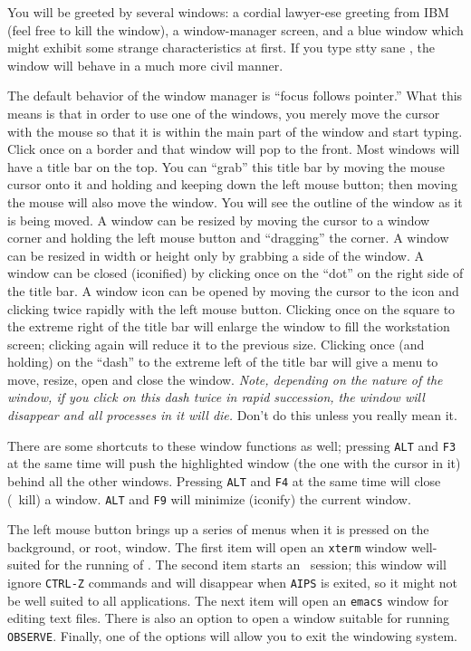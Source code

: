      You will be greeted by several windows: a cordial lawyer-ese
greeting from IBM (feel free to kill the window), a window-manager
screen, and a blue window which might exhibit some strange
characteristics at first. If you type {\us stty sane \CR}, the window
will behave in a much more civil manner.

     The default behavior of the window manager is ``focus follows
 pointer.''  What this means is that in order to use one
of the windows, you merely move the cursor with the mouse so that it
is within the main part of the window and start typing.  Click once on
a border and that window will pop to the front.  Most windows will
have a title bar on the top.  You can ``grab'' this title bar by
moving the mouse cursor onto it and holding and keeping down the left
mouse button; then moving the mouse will also move the window.  You
will see the outline of the window as it is being moved.  A window can
be resized by moving the cursor to a window corner and holding the
left mouse button and ``dragging'' the corner.  A window can be
resized in width or height only by grabbing a side of the window.  A
window can be closed (iconified) by clicking once on the ``dot'' on
the right side of the title bar.  A window icon can be opened by
moving the cursor to the icon and clicking twice rapidly with the left
mouse button.  Clicking once on the square to the extreme right of the
title bar will enlarge the window to fill the workstation screen;
clicking again will reduce it to the previous size.  Clicking once
(and holding) on the ``dash'' to the extreme left of the title bar
will give a menu to move, resize, open and close the window. {\it
Note, depending on the nature of the window, if you click on this dash
{\rm twice} in rapid succession, the window will disappear and all
processes in it will die.}  Don't do this unless you really mean it.

     There are some shortcuts to these window functions as well;
pressing {\tt ALT} and {\tt F3} at the same time will push the
highlighted window (the one with the cursor in it) behind all the
other windows.  Pressing {\tt ALT} and {\tt F4} at the same time will
close (\ie\ kill) a window.  {\tt ALT} and {\tt F9} will minimize
(iconify) the current window.

     The left mouse button brings up a series of menus when it is
pressed on the background, or root, window.  The first item will open
an {\tt xterm} window well-suited for the running of \hbox{\AIPS}.
The second item starts an \AIPS\ session; this window will ignore
{\tt CTRL-Z} commands and will disappear when {\tt AIPS} is exited, so
it might not be well suited to all applications.  The next item will
open an {\tt emacs} window for editing text files.  There is also an
option to open a window suitable for running \hbox{{\tt OBSERVE}}.
Finally, one of the options will allow you to exit the windowing
system.

